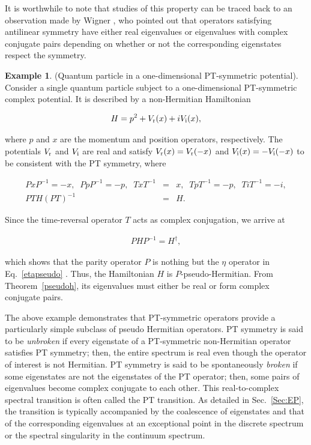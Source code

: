 \documentclass{tADP2e}
\theoremstyle{plain}
\newcommand{\eqn}[1]{
\begin{eqnarray}
	#1
\end{eqnarray}
}
\theoremstyle{plain}
\theoremstyle{definition}
\newtheorem{example}{Example}[section]
\newcommand{\exmp}[1]{
\begin{example}
	#1
\end{example}
}
\begin{document}
It is worthwhile to note that studies of this property can be traced back to an observation made by Wigner \cite{WE60}, who pointed out that operators satisfying  antilinear symmetry have either real eigenvalues or eigenvalues with complex conjugate pairs depending on whether or not the corresponding eigenstates  respect the symmetry.

\exmp{(Quantum particle in a one-dimensional PT-symmetric potential). Consider a single quantum particle subject to a one-dimensional PT-symmetric complex potential. It is described by a non-Hermitian Hamiltonian
\eqn{
H=p^2+V_{\rm r}(x)+iV_{\rm i}(x),
}
where $p$ and $x$ are the momentum and position operators, respectively. The potentials $V_{\rm r}$ and $V_{\rm i}$ are real and satisfy $V_{\rm r}(x)=V_{\rm r}(-x)$ and $V_{\rm i}(x)=-V_{\rm i}(-x)$ to be consistent with the PT symmetry, where
\eqn{
PxP^{-1}=-x,\;\;PpP^{-1}=-p,\;\;TxT^{-1}&=&x,\;\;TpT^{-1}=-p,\;\;TiT^{-1}=-i,\\
PT H (PT)^{-1}&=&H.
}
Since the time-reversal operator $T$ acts as complex conjugation, we arrive at
\eqn{
PHP^{-1}=H^{\dagger},
}
which shows that the parity operator $P$ is nothing but the $\eta$ operator in Eq.~\eqref{etapseudo} \cite{Mostafazadeh_2005}. Thus, the Hamiltonian $H$ is $P$-pseudo-Hermitian. From Theorem~\ref{pseudoh}, its eigenvalues must either be real or form complex conjugate pairs.
}

The above example demonstrates that  PT-symmetric operators provide a particularly simple subclass of pseudo Hermitian operators. PT symmetry is said to be {\it unbroken} if every  eigenstate of a PT-symmetric non-Hermitian operator satisfies  PT symmetry; then, the entire spectrum is real even though the operator of interest is not Hermitian. PT symmetry is said to be  spontaneously {\it broken} if some  eigenstates are not the eigenstates of the PT operator; then, some pairs of eigenvalues become complex conjugate to each other. This real-to-complex spectral transition is often called the PT transition. As detailed in Sec.~\ref{Sec:EP}, the transition is typically accompanied by the coalescence of  eigenstates and that of the corresponding eigenvalues at  an exceptional point  \cite{TK80} in the discrete spectrum or the spectral singularity  \cite{AM09} in the continuum spectrum. 
\end{document}
